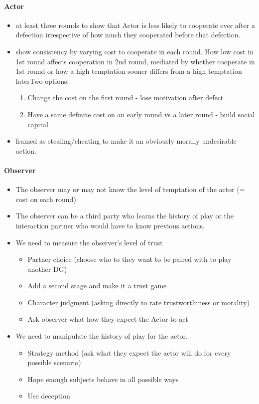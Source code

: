 \documentclass[11pt]{article}
\theoremstyle{plainCl1}
\begin{document}
\paragraph{Actor}
\begin{itemize}
    \item at least three rounds to show that Actor is less likely to cooperate ever after a defection irrespective of how much they cooperated before that defection.
    \item show consistency by varying cost to cooperate in each round. How low cost in 1st round affects cooperation in 2nd round, mediated by whether cooperate in 1st round or how a high temptation sooner differs from a high temptation laterTwo options:
    \begin{enumerate}
        \item Change the cost on the first round - lose motivation after defect
        \item Have a same definite cost on an early round vs a later round - build social capital
    \end{enumerate}
    \item framed as stealing/cheating to make it an obviously morally undesirable action.
\end{itemize}

\paragraph{Observer}
\begin{itemize}
    \item The observer may or may not know the level of temptation of the actor (= cost on each round)
    \item The observer can be a third party who learns the history of play or the interaction partner who would have to know previous actions. 
    \item We need to measure the observer's level of trust
    	\begin{itemize}
	\item Partner choice (choose who to they want to be paired with to play another DG)
	\item Add a second stage and make it a trust game
    	\item Character judgment (asking directly to rate trustworthiness or morality)
	\item Ask observer what how they expect the Actor to act
    	\end{itemize}
    \item We need to manipulate the history of play for the actor. 
    	\begin{itemize}
	\item Strategy method (ask what they expect the actor will do for every possible scenario)
	\item Hope enough subjects behave in all possible ways
    	\item Use deception
    	\end{itemize}
\end{itemize}
\end{document}
